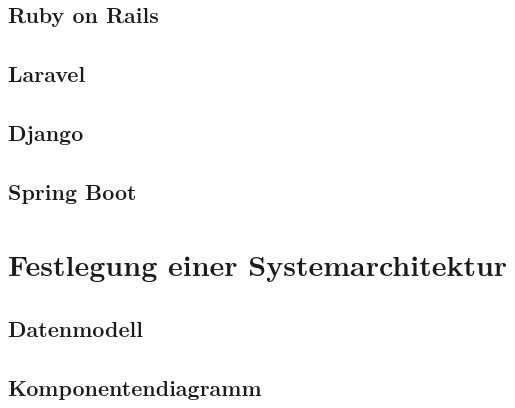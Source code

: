 

\subsection{Ruby on Rails}
\label{Ruby_on_Rails}


\subsection{Laravel}
\label{ss}


\subsection{Django}
\label{ss}


\subsection{Spring Boot}
\label{ss}


\section{Festlegung einer Systemarchitektur}
\label{Festlegung_einer_Systemarchitektur}

\subsection{Datenmodell}
\label{Datenmodell}

\subsection{Komponentendiagramm}
\label{Komponentendiagramm}